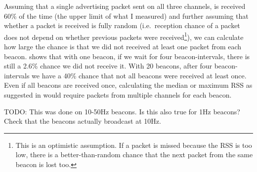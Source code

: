 Assuming that a single advertising packet sent on all three channels, is received 60\% of the time (the upper limit of what I measured) and further assuming that whether a packet is received is fully random (i.e.\ reception chance of a packet does not depend on whether previous packets were received\footnote{This is an optimistic assumption. If a packet is missed because the RSS is too low, there is a better-than-random chance that the next packet from the same beacon is lost too.}), we can calculate how large the chance is that we did not received at least one packet from each beacon.
 shows that with one beacon, if we wait for four beacon-intervals, there is still a 2.6\% chance we did not receive it.
With 20 beacons, after four beacon-intervals we have a 40\% chance that not all beacons were received at least once.
Even if all beacons are received once, calculating the median or maximum RSS as suggested in  would require packets from multiple channels for each beacon.

TODO: This was done on 10-50Hz beacons. Is this also true for 1Hz beacons? Check that the beacons actually broadcast at 10Hz.
